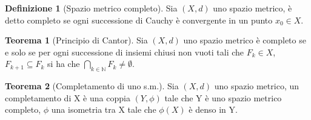 \documentclass[leqno]{article}
\theoremstyle{definition}
\newtheorem{definition}{Definizione}[section]
\numberwithin{equation}{section}
\newtheorem{theorem}{Teorema}[section]
\theoremstyle{remark}
\begin{document}
	\begin{definition}[Spazio metrico completo]
		Sia $(X,d)$ uno spazio metrico, è detto completo se ogni successione di Cauchy è convergente in un punto $x_0 \in X$.
	\end{definition}
	
	\begin{theorem}[Principio di Cantor]
		Sia $(X,d)$ uno spazio metrico è completo se e solo se per ogni successione di insiemi chiusi non vuoti tali che $F_k \in X$, $F_{k+1} \subseteq F_k$ si ha che $\bigcap_{k\in\mathbb{N}}F_k\neq \emptyset$.
	\end{theorem}
	\begin{theorem}[Completamento di uno s.m.]
		Sia $(X,d)$ uno spazio metrico, un completamento di X è una coppia $(Y,\phi)$ tale che Y è uno spazio metrico completo, $\phi$ una isometria tra X tale che $\phi(X)$ è denso in Y.
	\end{theorem}
\end{document}
